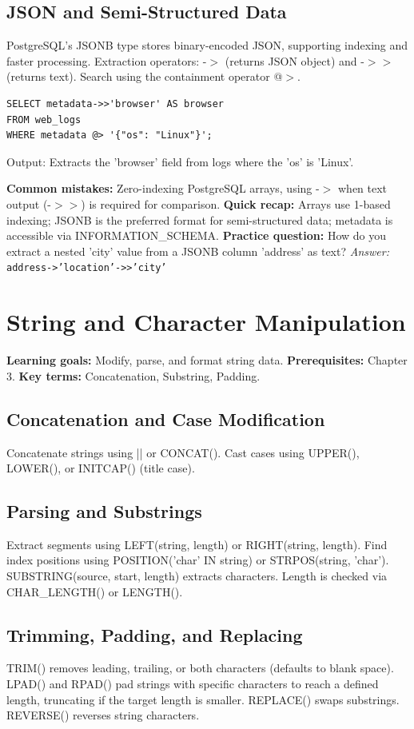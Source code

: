 \documentclass[12pt, a4paper]{article}
\begin{document}
\subsection{JSON and Semi-Structured Data}
PostgreSQL's JSONB type stores binary-encoded JSON, supporting indexing and faster processing. Extraction operators: -$>$ (returns JSON object) and -$>$$>$ (returns text). Search using the containment operator @$>$.

\begin{verbatim}
SELECT metadata->>'browser' AS browser
FROM web_logs
WHERE metadata @> '{"os": "Linux"}';
\end{verbatim}
Output: Extracts the 'browser' field from logs where the 'os' is 'Linux'.

\textbf{Common mistakes:} Zero-indexing PostgreSQL arrays, using -$>$ when text output (-$>$$>$) is required for comparison.
\textbf{Quick recap:} Arrays use 1-based indexing; JSONB is the preferred format for semi-structured data; metadata is accessible via INFORMATION\_SCHEMA.
\textbf{Practice question:} How do you extract a nested 'city' value from a JSONB column 'address' as text?
\textit{Answer:} \texttt{address->'location'->>'city'}

\section{String and Character Manipulation}
\textbf{Learning goals:} Modify, parse, and format string data.
\textbf{Prerequisites:} Chapter 3.
\textbf{Key terms:} Concatenation, Substring, Padding.

\subsection{Concatenation and Case Modification}
Concatenate strings using || or CONCAT(). Cast cases using UPPER(), LOWER(), or INITCAP() (title case).

\subsection{Parsing and Substrings}
Extract segments using LEFT(string, length) or RIGHT(string, length). Find index positions using POSITION('char' IN string) or STRPOS(string, 'char'). SUBSTRING(source, start, length) extracts characters. Length is checked via CHAR\_LENGTH() or LENGTH().

\subsection{Trimming, Padding, and Replacing}
TRIM() removes leading, trailing, or both characters (defaults to blank space). LPAD() and RPAD() pad strings with specific characters to reach a defined length, truncating if the target length is smaller. REPLACE() swaps substrings. REVERSE() reverses string characters.
\end{document}
